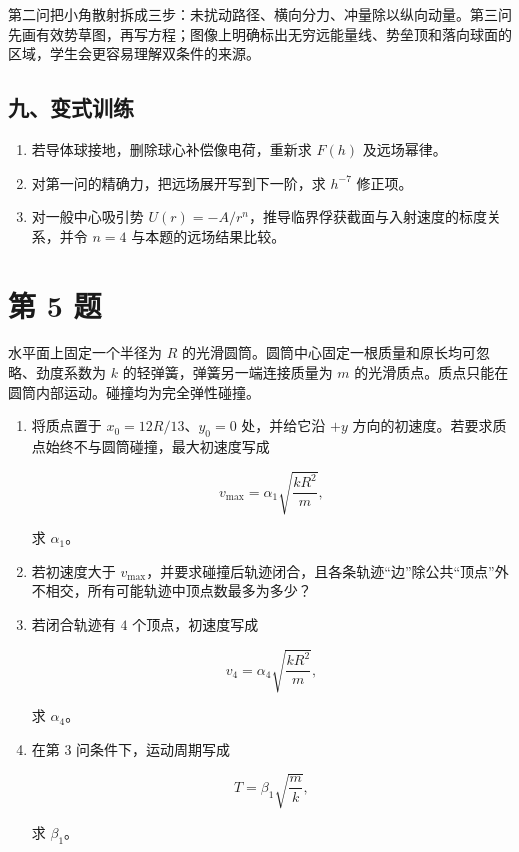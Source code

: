 \documentclass[12pt,a4paper,UTF8]{ctexart}
\newcommand{\tightlist}{\setlength{\itemsep}{0pt}\setlength{\parskip}{0pt}}
\begin{document}
第二问把小角散射拆成三步：未扰动路径、横向分力、冲量除以纵向动量。第三问先画有效势草图，再写方程；图像上明确标出无穷远能量线、势垒顶和落向球面的区域，学生会更容易理解双条件的来源。

\subsection{九、变式训练}\label{ux4e5dux53d8ux5f0fux8badux7ec3-3}

\begin{enumerate}
\def\labelenumi{\arabic{enumi}.}
\tightlist
\item
  若导体球接地，删除球心补偿像电荷，重新求 \(F(h)\) 及远场幂律。
\item
  对第一问的精确力，把远场展开写到下一阶，求 \(h^{-7}\) 修正项。
\item
  对一般中心吸引势
  \(U(r)=-A/r^n\)，推导临界俘获截面与入射速度的标度关系，并令 \(n=4\)
  与本题的远场结果比较。
\end{enumerate}

\newpage

\section{第 5 题}\label{ux7b2c-5-ux9898}

水平面上固定一个半径为 \(R\)
的光滑圆筒。圆筒中心固定一根质量和原长均可忽略、劲度系数为 \(k\)
的轻弹簧，弹簧另一端连接质量为 \(m\)
的光滑质点。质点只能在圆筒内部运动。碰撞均为完全弹性碰撞。

\begin{enumerate}
\def\labelenumi{\arabic{enumi}.}
\item
  将质点置于 \(x_0=12R/13\)、\(y_0=0\) 处，并给它沿 \(+y\)
  方向的初速度。若要求质点始终不与圆筒碰撞，最大初速度写成

  \[v_{\max}=\alpha_1\sqrt{\frac{kR^2}{m}},\]

  求 \(\alpha_1\)。
\item
  若初速度大于
  \(v_{\max}\)，并要求碰撞后轨迹闭合，且各条轨迹``边''除公共``顶点''外不相交，所有可能轨迹中顶点数最多为多少？
\item
  若闭合轨迹有 \(4\) 个顶点，初速度写成

  \[v_4=\alpha_4\sqrt{\frac{kR^2}{m}},\]

  求 \(\alpha_4\)。
\item
  在第 3 问条件下，运动周期写成

  \[T=\beta_1\sqrt{\frac{m}{k}},\]

  求 \(\beta_1\)。
\end{enumerate}
\end{document}
